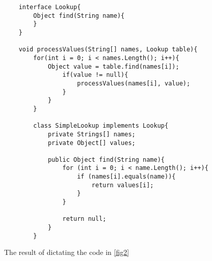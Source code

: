\begin{figure}[H]
	\begin{lstlisting}
	interface Lookup{
		Object find(String name){
		}
	}
	
	void processValues(String[] names, Lookup table){
		for(int i = 0; i < names.Length(); i++){
			Object value = table.find(names[i]);
				if(value != null){
					processValues(names[i], value);
				}
			}
		}
		
		class SimpleLookup implements Lookup{
			private Strings[] names;
			private Object[] values;
			
			public Object find(String name){
				for (int i = 0; i < name.Length(); i++){
					if (names[i].equals(name)){
						return values[i];
					}
				}
				
				return null;
			}
		}
	\end{lstlisting}
	\caption{The result of dictating the code in \autoref{fig2}}
	\label{fig3}
\end{figure}
